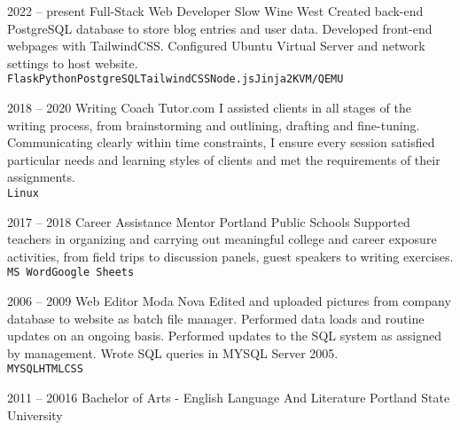 \documentclass[9pt]{developercv} %
\begin{document}
\begin{entrylist}
		\entry
		{2022 -- present}
		{Full-Stack Web Developer}
		{Slow Wine West}
		{Created back-end PostgreSQL database to store blog entries and user data.
		Developed front-end webpages with TailwindCSS. Configured Ubuntu Virtual Server 
		and network settings to host website. 
		\\ \texttt{Flask}\slashsep\texttt{Python}\slashsep\texttt{PostgreSQL}\slashsep\texttt{TailwindCSS}\slashsep\texttt{Node.js}\slashsep\texttt{Jinja2}\slashsep\texttt{KVM/QEMU}}
		
	\entry
		{2018 -- 2020}
		{Writing Coach}
		{Tutor.com}
		{I assisted clients in all stages of the writing process, from
		brainstorming and outlining, drafting and fine-tuning. Communicating clearly
		within time constraints, I ensure every session satisfied particular needs and
		learning styles of clients and met the requirements of their assignments.
		\\ \texttt{Linux}}

	\entry
		{2017 -- 2018}
		{Career Assistance Mentor}
		{Portland Public Schools}
		{Supported teachers in organizing and carrying out meaningful college and
		career exposure activities, from field trips to discussion panels, guest
		speakers to writing exercises.
		\\ \texttt{MS Word}\slashsep\texttt{Google Sheets}}
		
	\entry
		{2006 -- 2009}
		{Web Editor}
		{Moda Nova}
		{Edited and uploaded pictures from company database to website as batch file manager. Performed data loads and routine updates on an ongoing basis. 
		Performed updates to the SQL system as assigned by management.		
		Wrote SQL queries in MYSQL Server 2005.
		\\ \texttt{MYSQL}\slashsep\texttt{HTML}\slashsep\texttt{CSS}}
\end{entrylist}



\begin{entrylist}
	\entry
		{2011 -- 20016}
		{Bachelor of Arts - English Language And Literature}
		{Portland State University}
		
\end{entrylist}

\end{document}
